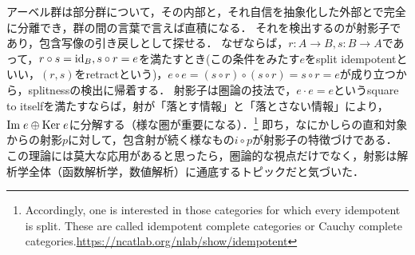 \documentclass[uplatex,dvipdfmx]{jsreport}
\begin{document}
\begin{tcolorbox}[colframe=ForestGreen, colback=ForestGreen!10!white,breakable,colbacktitle=ForestGreen!40!white,coltitle=black,fonttitle=\bfseries\sffamily,
title=idempotent morphismによる分解]
    アーベル群は部分群について，その内部と，それ自信を抽象化した外部とで完全に分離でき，群の間の言葉で言えば直積になる．
    それを検出するのが射影子であり，包含写像の引き戻しとして探せる．
    なぜならば，$r:A\to B,s:B\to A$であって，$r\circ s=\mathrm{id}_B,s\circ r=e$を満たすとき(この条件をみたす$e$をsplit idempotentといい，$(r,s)$をretractという)，$e\circ e=(s\circ r)\circ(s\circ r)=s\circ r=e$が成り立つから，splitnessの検出に帰着する．
    射影子は圏論の技法で，$e\cdot e=e$というsquare to itselfを満たすならば，射が「落とす情報」と「落とさない情報」により，$\mathrm{Im}\; e\oplus\mathrm{Ker}\; e$に分解する（様な圏が重要になる）．\footnote{Accordingly, one is interested in those categories for which every idempotent is split. These are called idempotent complete categories or Cauchy complete categories.\url{https://ncatlab.org/nlab/show/idempotent}}
    即ち，なにかしらの直和対象からの射影$p$に対して，包含射が続く様なもの$i\circ p$が射影子の特徴づけである．
    この理論には莫大な応用があると思ったら，圏論的な視点だけでなく，射影は解析学全体（函数解析学，数値解析）に通底するトピックだと気づいた．
\end{tcolorbox}
\end{document}
